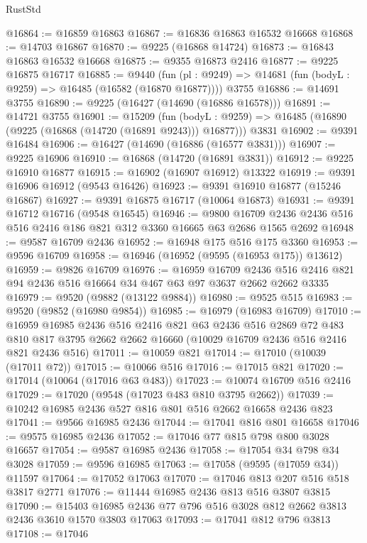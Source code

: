 \begin{lexlean}{RustStd}
\begin{coremodule}
@16864 := @16859 @16863
@16867 := @16836 @16863 @16532 @16668
@16868 := @14703 @16867
@16870 := @9225 (@16868 @14724)
@16873 := @16843 @16863 @16532 @16668
@16875 := @9355 @16873 @2416
@16877 := @9225 @16875 @16717
@16885 := @9440
    (fun (pl : @9249) => @14681 (fun (bodyL : @9259) => @16485 (@16582 (@16870 @16877))))
    @3755
@16886 := @14691 @3755
@16890 := @9225 (@16427 (@14690 (@16886 @16578)))
@16891 := @14721 @3755
@16901 := @15209
    (fun (bodyL : @9259) => @16485 (@16890 (@9225 (@16868 (@14720 (@16891 @9243))) @16877)))
    @3831
@16902 := @9391 @16484
@16906 := @16427 (@14690 (@16886 (@16577 @3831)))
@16907 := @9225 @16906
@16910 := @16868 (@14720 (@16891 @3831))
@16912 := @9225 @16910 @16877
@16915 := @16902 (@16907 @16912) @13322
@16919 := @9391 @16906 @16912 (@9543 @16426)
@16923 := @9391 @16910 @16877 (@15246 @16867)
@16927 := @9391 @16875 @16717 (@10064 @16873)
@16931 := @9391 @16712 @16716 (@9548 @16545)
@16946 := @9800 @16709 @2436 @2436 @516 @516 @2416 @186 @821 @312 @3360 @16665 @63 @2686 @1565 @2692
@16948 := @9587 @16709 @2436
@16952 := @16948 @175 @516 @175 @3360
@16953 := @9596 @16709
@16958 := @16946 (@16952 (@9595 (@16953 @175)) @13612)
@16959 := @9826 @16709
@16976 := @16959
    @16709
    @2436
    @516
    @2416
    @821
    @94
    @2436
    @516
    @16664
    @34
    @467
    @63
    @97
    @3637
    @2662
    @2662
    @3335
@16979 := @9520 (@9882 (@13122 @9884))
@16980 := @9525 @515
@16983 := @9520 (@9852 (@16980 @9854))
@16985 := @16979 (@16983 @16709)
@17010 := @16959
    @16985
    @2436
    @516
    @2416
    @821
    @63
    @2436
    @516
    @2869
    @72
    @483
    @810
    @817
    @3795
    @2662
    @2662
    @16660
    (@10029 @16709 @2436 @516 @2416 @821 @2436 @516)
@17011 := @10059 @821
@17014 := @17010 (@10039 (@17011 @72))
@17015 := @10066 @516
@17016 := @17015 @821
@17020 := @17014 (@10064 (@17016 @63 @483))
@17023 := @10074 @16709 @516 @2416
@17029 := @17020 (@9548 (@17023 @483 @810 @3795 @2662))
@17039 := @10242 @16985 @2436 @527 @816 @801 @516 @2662 @16658 @2436 @823
@17041 := @9566 @16985 @2436
@17044 := @17041 @816 @801 @16658
@17046 := @9575 @16985 @2436
@17052 := @17046 @77 @815 @798 @800 @3028 @16657
@17054 := @9587 @16985 @2436
@17058 := @17054 @34 @798 @34 @3028
@17059 := @9596 @16985
@17063 := @17058 (@9595 (@17059 @34)) @11597
@17064 := @17052 @17063
@17070 := @17046 @813 @207 @516 @518 @3817 @2771
@17076 := @11444 @16985 @2436 @813 @516 @3807 @3815
@17090 := @15403 @16985 @2436 @77 @796 @516 @3028 @812 @2662 @3813 @2436 @3610 @1570 @3803 @17063
@17093 := @17041 @812 @796 @3813
@17108 := @17046

\end{coremodule}
\end{lexlean}
